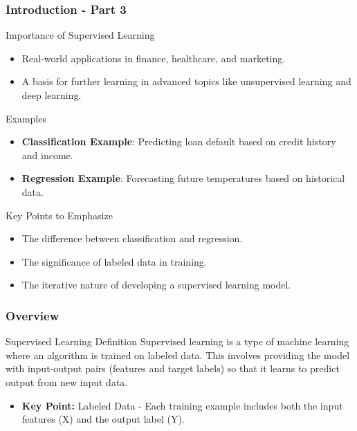 \documentclass{beamer}
\begin{document}
\begin{frame}[fragile]
    \frametitle{Introduction - Part 3}
    \begin{block}{Importance of Supervised Learning}
        \begin{itemize}
            \item Real-world applications in finance, healthcare, and marketing.
            \item A basis for further learning in advanced topics like unsupervised learning and deep learning.
        \end{itemize}
    \end{block}
    
    \begin{block}{Examples}
        \begin{itemize}
            \item \textbf{Classification Example}: Predicting loan default based on credit history and income.
            \item \textbf{Regression Example}: Forecasting future temperatures based on historical data.
        \end{itemize}
    \end{block}
    
    \begin{block}{Key Points to Emphasize}
        \begin{itemize}
            \item The difference between classification and regression.
            \item The significance of labeled data in training.
            \item The iterative nature of developing a supervised learning model.
        \end{itemize}
    \end{block}
\end{frame}

\begin{frame}[fragile]
    \frametitle{Overview}
    \begin{block}{Supervised Learning Definition}
        Supervised learning is a type of machine learning where an algorithm is trained on labeled data. This involves providing the model with input-output pairs (features and target labels) so that it learns to predict output from new input data.
    \end{block}
    \begin{itemize}
        \item \textbf{Key Point:} Labeled Data - Each training example includes both the input features (X) and the output label (Y).
    \end{itemize}
\end{frame}
\end{document}
